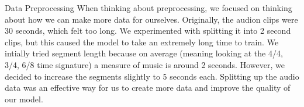 Data Preprocessing
When thinking about preprocessing, we focused on thinking about how we can make more data for ourselves. 
Originally, the audion clips were 30 seconds, which felt too long. We experimented with splitting it into 2 second clips, 
but this caused the model to take an extremely long time to train. We intially tried segment length because on average (meaning 
looking at the 4/4, 3/4, 6/8 time signature) a measure of music is around 2 seconds. However, we decided to increase the segments 
slightly to 5 seconds each. Splitting up the audio data was an effective way for us to create more data and improve the quality 
of our model.